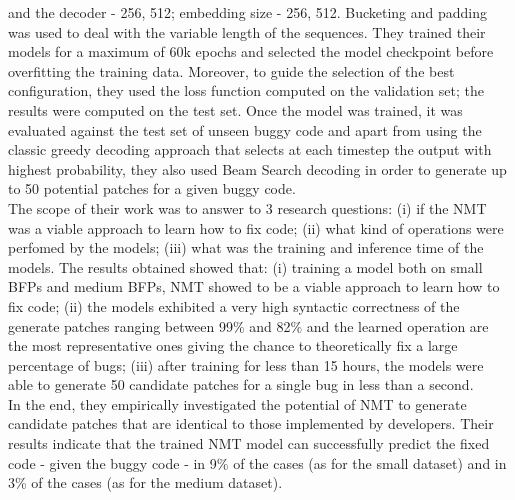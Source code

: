 and the decoder - 256, 512; embedding size - 256, 512.
Bucketing and padding was used to deal with the variable length of the sequences.
They trained their models for a maximum of 60k epochs and selected the model checkpoint before 
overfitting the training data. Moreover, to guide the selection of the best configuration, they 
used the loss function computed on the validation set; the results were computed on the test set.
Once the model was trained, it was evaluated against the test set of unseen buggy code and apart from using the classic
greedy decoding approach that selects at each timestep the output with highest probability, they also used Beam Search decoding
in order to generate up to 50 potential patches for a given buggy code.\\
\newline
The scope of their work was to answer to 3 research questions: (i) if the NMT was a viable approach 
to learn how to fix code; (ii) what kind of operations were perfomed by the models; (iii) what was the training 
and inference time of the models. The results obtained showed that: (i) training a model both on small BFPs and medium
BFPs, NMT showed to be a viable approach to learn how to fix code; (ii) the models exhibited a very high syntactic 
correctness of the generate patches ranging between 99\% and 82\% and the learned operation are the most representative ones 
giving the chance to theoretically fix a large percentage of bugs; (iii) after training for less than 15 hours,
the models were able to generate 50 candidate patches for a single bug in less than a second.\\
\newline
In the end, they empirically investigated the potential of NMT to generate
candidate patches that are identical to those implemented by developers. Their results indicate 
that the trained NMT model can successfully predict the fixed code - given the buggy code - in 9\% of the cases (as for the small dataset) and in 
3\% of the cases (as for the medium dataset).

